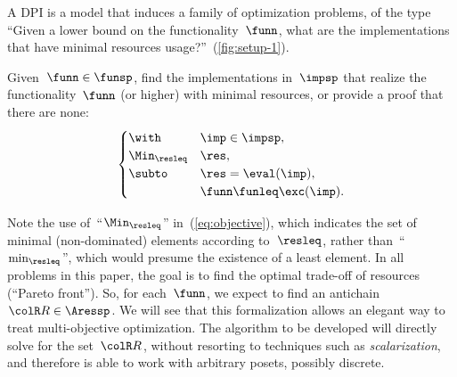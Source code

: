A DPI is a model that induces a family of optimization problems, of
the type ``Given a lower bound on the functionality~$\funn$, what
are the implementations that have minimal resources usage?''~(\cref{fig:setup-1}).
\begin{problem}
\label{prob:problem1}Given~$\funn\in\funsp$, find the implementations
in~$\impsp$ that realize the functionality~$\funn$ (or higher)
with minimal resources, or provide a proof that there are none:
\begin{equation}
\begin{cases}
\with & \imp\in\impsp,\\
\Min_{\resleq} & \res,\\
\subto & \res=\eval(\imp),\\
 & \funn\funleq\exc(\imp).
\end{cases}\label{eq:objective}
\end{equation}
\end{problem}


\begin{remark}
Note the use of~``$\Min_{\resleq}$'' in~(\ref{eq:objective}),
which indicates the set of minimal (non-dominated) elements according
to~$\resleq$, rather than~``$\min_{\resleq}$'', which would
presume the existence of a least element. In all problems in this
paper, the goal is to find the optimal trade-off of resources (``Pareto
front''). So, for each~$\funn$, we expect to find an antichain~${\colR R}\in\Aressp$.
We will see that this formalization allows an elegant way to treat
multi-objective optimization. The algorithm to be developed will directly
solve for the set~${\colR R}$, without resorting to techniques such
as \emph{scalarization}, and therefore is able to work with arbitrary
posets, possibly discrete.
\end{remark}

